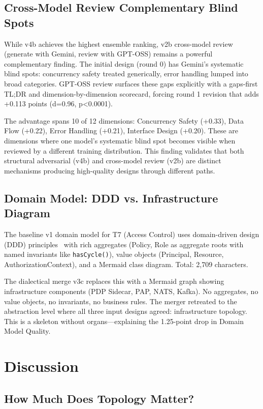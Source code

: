 \documentclass[conference]{IEEEtran}
\begin{document}
\subsection{Cross-Model Review Complementary Blind Spots}

While v4b achieves the highest ensemble ranking, v2b cross-model review (generate with Gemini, review with GPT-OSS) remains a powerful complementary finding. The initial design (round 0) has Gemini's systematic blind spots: concurrency safety treated generically, error handling lumped into broad categories. GPT-OSS review surfaces these gaps explicitly with a gaps-first TL;DR and dimension-by-dimension scorecard, forcing round 1 revision that adds +0.113 points (d=0.96, p<0.0001).

The advantage spans 10 of 12 dimensions: Concurrency Safety (+0.33), Data Flow (+0.22), Error Handling (+0.21), Interface Design (+0.20). These are dimensions where one model's systematic blind spot becomes visible when reviewed by a different training distribution. This finding validates that both structural adversarial (v4b) and cross-model review (v2b) are distinct mechanisms producing high-quality designs through different paths.

\subsection{Domain Model: DDD vs. Infrastructure Diagram}

The baseline v1 domain model for T7 (Access Control) uses domain-driven design (DDD) principles~\cite{evans} with rich aggregates (Policy, Role as aggregate roots with named invariants like \texttt{hasCycle()}), value objects (Principal, Resource, AuthorizationContext), and a Mermaid class diagram. Total: 2,709 characters.

The dialectical merge v3c replaces this with a Mermaid graph showing infrastructure components (PDP Sidecar, PAP, NATS, Kafka). No aggregates, no value objects, no invariants, no business rules. The merger retreated to the abstraction level where all three input designs agreed: infrastructure topology. This is a skeleton without organs---explaining the 1.25-point drop in Domain Model Quality.

\section{Discussion}

\subsection{How Much Does Topology Matter?}
\end{document}
